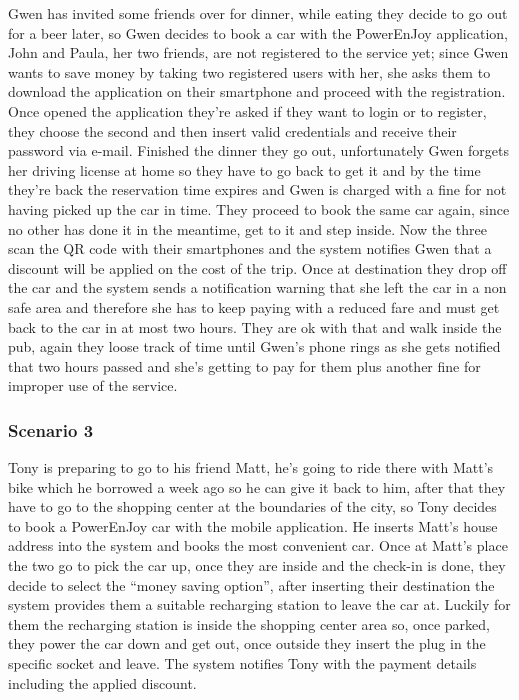 \documentclass[]{article}
\begin{document}
Gwen has invited some friends over for dinner, while eating they decide
to go out for a beer later, so Gwen decides to book a car with the
PowerEnJoy application, John and Paula, her two friends, are not
registered to the service yet; since Gwen wants to save money by taking
two registered users with her, she asks them to download the application
on their smartphone and proceed with the registration. Once opened the
application they're asked if they want to login or to register, they
choose the second and then insert valid credentials and receive their
password via e-mail. Finished the dinner they go out, unfortunately Gwen
forgets her driving license at home so they have to go back to get it
and by the time they're back the reservation time expires and Gwen is
charged with a fine for not having picked up the car in time. They
proceed to book the same car again, since no other has done it in the
meantime, get to it and step inside. Now the three scan the QR code with
their smartphones and the system notifies Gwen that a discount will be
applied on the cost of the trip. Once at destination they drop off the
car and the system sends a notification warning that she left the car in
a non safe area and therefore she has to keep paying with a reduced fare
and must get back to the car in at most two hours. They are ok with that
and walk inside the pub, again they loose track of time until Gwen's
phone rings as she gets notified that two hours passed and she's getting
to pay for them plus another fine for improper use of the service.

\subsubsection{Scenario 3}\label{scenario-3}

Tony is preparing to go to his friend Matt, he's going to ride there
with Matt's bike which he borrowed a week ago so he can give it back to
him, after that they have to go to the shopping center at the boundaries
of the city, so Tony decides to book a PowerEnJoy car with the mobile
application. He inserts Matt's house address into the system and books
the most convenient car. Once at Matt's place the two go to pick the car
up, once they are inside and the check-in is done, they decide to select
the ``money saving option'', after inserting their destination the
system provides them a suitable recharging station to leave the car at.
Luckily for them the recharging station is inside the shopping center
area so, once parked, they power the car down and get out, once outside
they insert the plug in the specific socket and leave. The system
notifies Tony with the payment details including the applied discount.
\end{document}
